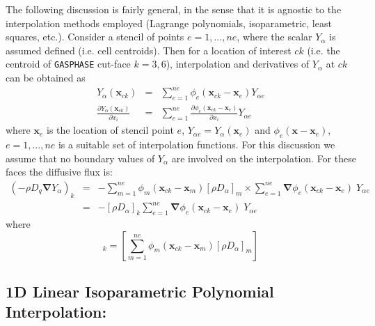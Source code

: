 The following discussion is fairly general, in the sense that it is agnostic to the interpolation methods employed (Lagrange polynomials, isoparametric, least squares, etc.).
Consider a stencil of points $e=1,...,ne$, where the scalar $Y_\alpha$ is assumed defined (i.e. cell centroids). Then for a location of interest $ck$ (i.e. the centroid of \texttt{GASPHASE} cut-face $k=3,6$), interpolation and derivatives of $Y_\alpha$ at $ck$ can be obtained as
%
\begin{eqnarray}
   Y_\alpha(\mathbf{x}_{ck}) & = & \sum^{ne}_{e=1} \phi_e(\mathbf{x}_{ck}-\mathbf{x}_e) Y_{\alpha e} \label{eq:interpqfluid} \\
   \frac{\partial Y_\alpha(\mathbf{x}_{ck})}{\partial x_i} & = & \sum^{ne}_{e=1} \frac{\partial \phi_e(\mathbf{x}_{ck}-\mathbf{x}_e)}{\partial x_i} Y_{\alpha e} \label{eq:interpdqfluid}
\end{eqnarray}
%
where $\mathbf{x}_e$ is the location of stencil point $e$, $Y_{\alpha e} =Y_\alpha(\mathbf{x}_e)$  and $\phi_e(\mathbf{x}-\mathbf{x}_e)$, $e=1,...,ne$ is a suitable set of interpolation functions.
For this discussion we assume that no boundary values of $Y_\alpha$ are involved on the interpolation. For these faces the diffusive flux is:
%
\begin{eqnarray}
  \left( - \rho D_q \boldsymbol{\nabla} Y_\alpha \right)_k & = & - \sum^{ne}_{m=1} \phi_m(\mathbf{x}_{ck}-\mathbf{x}_m) [\rho D_\alpha]_m \times
      \sum^{ne}_{e=1} \boldsymbol{\nabla} \phi_e(\mathbf{x}_{ck}-\mathbf{x}_e) \; Y_{\alpha e} \nonumber \\
      &=& - [\rho D_\alpha]_k \sum^{ne}_{e=1}  \boldsymbol{\nabla} \phi_e(\mathbf{x}_{ck}-\mathbf{x}_e) \; Y_{\alpha e}
      \label{eq:diffflx}
\end{eqnarray}
%
where
%
\begin{equation}
 [\rho D_\alpha]_k = \left[ \sum^{ne}_{m=1} \phi_m(\mathbf{x}_{ck}-\mathbf{x}_m) [\rho D_\alpha]_m \right]
\end{equation}
%

\subsection*{1D Linear Isoparametric Polynomial Interpolation:}

